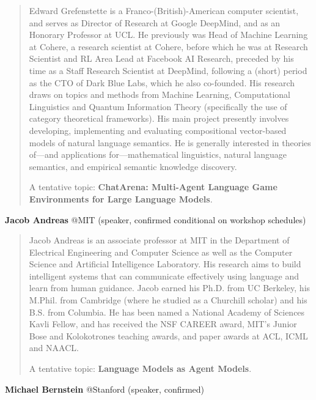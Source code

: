 \documentclass[10pt]{article} %
\begin{document}
\begin{quote}
        Edward Grefenstette is a Franco-(British)-American computer scientist, and serves as Director of Research at Google DeepMind, and as an Honorary Professor at UCL. He previously was Head of Machine Learning at Cohere, a research scientist at Cohere, before which he was at Research Scientist and RL Area Lead at Facebook AI Research, preceded by his time as a Staff Research Scientist at DeepMind, following a (short) period as the CTO of Dark Blue Labs, which he also co-founded. His research draws on topics and methods from Machine Learning, Computational Linguistics and Quantum Information Theory (specifically the use of category theoretical frameworks). His main project presently involves developing, implementing and evaluating compositional vector-based models of natural language semantics. He is generally interested in theories of—and applications for—mathematical linguistics, natural language semantics, and empirical semantic knowledge discovery.  
    
    A tentative topic: {\bf ChatArena: Multi-Agent Language Game Environments for Large Language Models}.
\end{quote}



{\bf Jacob Andreas} @MIT (speaker, confirmed conditional on workshop schedules)  

\begin{quote}
    Jacob Andreas is an associate professor at MIT in the Department of Electrical Engineering and Computer Science as well as the Computer Science and Artificial Intelligence Laboratory. His research aims to build intelligent systems that can communicate effectively using language and learn from human guidance. Jacob earned his Ph.D. from UC Berkeley, his M.Phil. from Cambridge (where he studied as a Churchill scholar) and his B.S. from Columbia. He has been named a National Academy of Sciences Kavli Fellow, and has received the NSF CAREER award, MIT's Junior Bose and Kolokotrones teaching awards, and paper awards at ACL, ICML and NAACL.  

    A tentative topic: {\bf Language Models as Agent Models}.
\end{quote}



{\bf Michael Bernstein} @Stanford (speaker, confirmed)  
\end{document}
